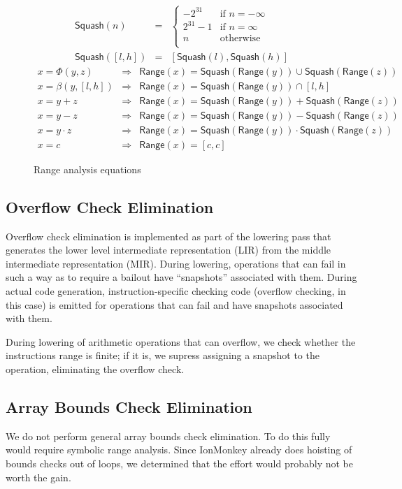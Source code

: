 \documentclass{article}
\newcommand{\Squash}{\mathsf{Squash}}
\newcommand{\Range}{\mathsf{Range}}
\let\x\cdot
\begin{document}
\begin{figure}[ht]
\begin{eqnarray*}
\Squash(n) &=& \begin{cases}
 -2^{31} &\text{if } n = -\infty \\
2^{31}-1 &\text{if } n = \infty \\
n&\text{otherwise } \\
\end{cases}\\
\Squash([l, h]) &=& [\Squash(l), \Squash(h)]
\end{eqnarray*}
%
\begin{eqnarray*}
x = \Phi(y, z) &\Rightarrow&
    \Range(x) = \Squash(\Range(y)) \cup \Squash(\Range(z)) \\
x = \beta(y, [l, h]) &\Rightarrow& \Range(x) = \Squash(\Range(y)) \cap [l, h] \\
x = y + z &\Rightarrow& \Range(x) = \Squash(\Range(y)) + \Squash(\Range(z)) \\
x = y - z &\Rightarrow& \Range(x) = \Squash(\Range(y)) - \Squash(\Range(z)) \\
x = y \x z &\Rightarrow& \Range(x) = \Squash(\Range(y)) \x \Squash(\Range(z)) \\
x = c &\Rightarrow& \Range(x) = [c, c]
\end{eqnarray*}
\caption{Range analysis equations}
\label{fig:range_anal}
\end{figure}

\subsection{Overflow Check Elimination}
Overflow check elimination is implemented as part of the lowering pass
that generates the lower level intermediate representation (LIR) from
the middle intermediate representation (MIR). During lowering,
operations that can fail in such a way as to require a bailout have
``snapshots'' associated with them. During actual code generation,
instruction-specific checking code (overflow checking, in this case)
is emitted for operations that can fail and have snapshots associated
with them.

During lowering of arithmetic operations that can overflow, we check
whether the instructions range is finite; if it is, we supress
assigning a snapshot to the operation, eliminating the overflow check.

\subsection{Array Bounds Check Elimination}
We do not perform general array bounds check elimination. To do this
fully would require symbolic range analysis. Since IonMonkey already
does hoisting of bounds checks out of loops, we determined that the
effort would probably not be worth the gain.
\end{document}
